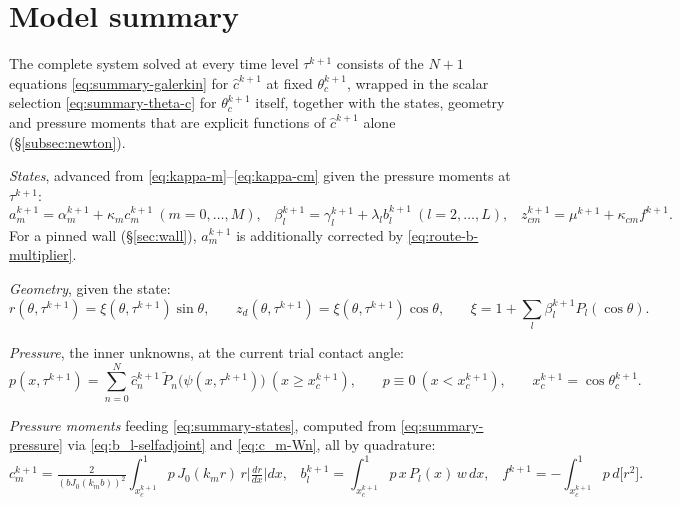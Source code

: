 \section{Model summary}
\label{sec:summary}

The complete system solved at every time level $\tau^{k+1}$ consists of the $N+1$ equations \eqref{eq:summary-galerkin} for $\hat c^{k+1}$ at fixed $\theta_c^{k+1}$, wrapped in the scalar selection \eqref{eq:summary-theta-c} for $\theta_c^{k+1}$ itself, together with the states, geometry and pressure moments that are explicit functions of $\hat c^{k+1}$ alone (\S\ref{subsec:newton}).

\emph{States}, advanced from \eqref{eq:kappa-m}--\eqref{eq:kappa-cm} given the pressure moments at $\tau^{k+1}$:
\begin{equation}
    a_m^{k+1}=\alpha_m^{k+1}+\kappa_mc_m^{k+1}\ (m=0,\dots,M)\text{,}\quad
    \beta_l^{k+1}=\gamma_l^{k+1}+\lambda_lb_l^{k+1}\ (l=2,\dots,L)\text{,}\quad
    z_{cm}^{k+1}=\mu^{k+1}+\kappa_{cm}f^{k+1}\text{.}
    \label{eq:summary-states}
\end{equation}
For a pinned wall (\S\ref{sec:wall}), $a_m^{k+1}$ is additionally corrected by \eqref{eq:route-b-multiplier}.

\emph{Geometry}, given the state:
\begin{equation}
    r(\theta,\tau^{k+1})=\xi(\theta,\tau^{k+1})\sin\theta\text{,}\qquad z_d(\theta,\tau^{k+1})=\xi(\theta,\tau^{k+1})\cos\theta\text{,}\qquad
    \xi=1+\textstyle\sum_l\beta_l^{k+1}P_l(\cos\theta)\text{.}
    \label{eq:summary-geometry}
\end{equation}

\emph{Pressure}, the inner unknowns, at the current trial contact angle:
\begin{equation}
    p(x,\tau^{k+1})=\sum_{n=0}^N\hat c_n^{k+1}\,\tilde P_n\big(\psi(x,\tau^{k+1})\big)\ (x\ge x_c^{k+1})\text{,}\qquad p\equiv0\ (x<x_c^{k+1})\text{,}\qquad x_c^{k+1}=\cos\theta_c^{k+1}\text{.}
    \label{eq:summary-pressure}
\end{equation}

\emph{Pressure moments} feeding \eqref{eq:summary-states}, computed from \eqref{eq:summary-pressure} via \eqref{eq:b_l-selfadjoint} and \eqref{eq:c_m-Wn}, all by quadrature:
\begin{equation}
    c_m^{k+1}=\tfrac{2}{(bJ_0(k_mb))^2}\!\int_{x_c^{k+1}}^1\! p\,J_0(k_mr)\,r\Big|\tfrac{dr}{dx}\Big|dx\text{,}\quad
    b_l^{k+1}=\!\int_{x_c^{k+1}}^1\! p\,x\,P_l(x)\,w\,dx\text{,}\quad
    f^{k+1}=-\!\int_{x_c^{k+1}}^1\! p\,d\big[r^2\big]\text{.}
    \label{eq:summary-moments}
\end{equation}

